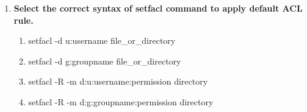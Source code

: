 \begin{flushleft}
\begin{enumerate}
		\item \textbf{Select the correct syntax of setfacl command to apply default ACL rule.}
		\begin{enumerate}[label=(\alph*)]
			\item setfacl -d u:username  file\_or\_directory  
			\item setfacl -d g:groupname  file\_or\_directory  
			\item setfacl -R -m d:u:username:permission  directory %
			\item setfacl -R -m d:g:groupname:permission  directory    %
		\end{enumerate}
		\bigskip
		\bigskip
	\end{enumerate}
	
	
\end{flushleft}

\newpage

\afterpage{\blankpage}